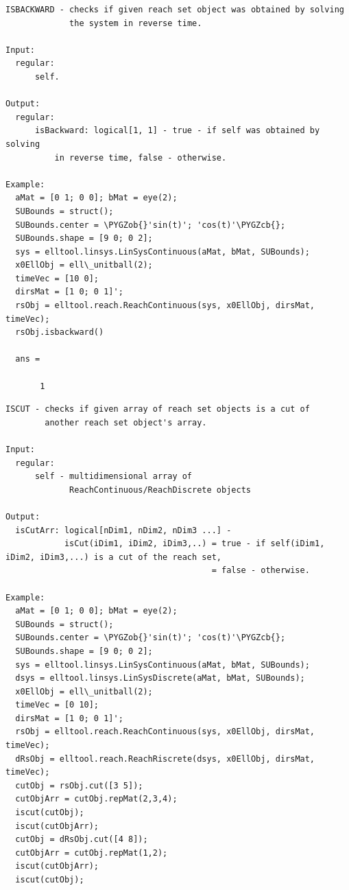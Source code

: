 \documentclass[letterpaper,10pt,english]{sphinxmanual}
\def\PYGZob{\char`\{}
\def\PYGZcb{\char`\}}
\begin{document}
\begin{Verbatim}[commandchars=\\\{\}]
ISBACKWARD - checks if given reach set object was obtained by solving
             the system in reverse time.

Input:
  regular:
      self.

Output:
  regular:
      isBackward: logical[1, 1] - true - if self was obtained by solving
          in reverse time, false - otherwise.

Example:
  aMat = [0 1; 0 0]; bMat = eye(2);
  SUBounds = struct();
  SUBounds.center = \PYGZob{}'sin(t)'; 'cos(t)'\PYGZcb{};
  SUBounds.shape = [9 0; 0 2];
  sys = elltool.linsys.LinSysContinuous(aMat, bMat, SUBounds);
  x0EllObj = ell\_unitball(2);
  timeVec = [10 0];
  dirsMat = [1 0; 0 1]';
  rsObj = elltool.reach.ReachContinuous(sys, x0EllObj, dirsMat, timeVec);
  rsObj.isbackward()

  ans =

       1
\end{Verbatim}

\begin{Verbatim}[commandchars=\\\{\}]
ISCUT - checks if given array of reach set objects is a cut of
        another reach set object's array.

Input:
  regular:
      self - multidimensional array of
             ReachContinuous/ReachDiscrete objects

Output:
  isCutArr: logical[nDim1, nDim2, nDim3 ...] -
            isCut(iDim1, iDim2, iDim3,..) = true - if self(iDim1, iDim2, iDim3,...) is a cut of the reach set,
                                          = false - otherwise.

Example:
  aMat = [0 1; 0 0]; bMat = eye(2);
  SUBounds = struct();
  SUBounds.center = \PYGZob{}'sin(t)'; 'cos(t)'\PYGZcb{};
  SUBounds.shape = [9 0; 0 2];
  sys = elltool.linsys.LinSysContinuous(aMat, bMat, SUBounds);
  dsys = elltool.linsys.LinSysDiscrete(aMat, bMat, SUBounds);
  x0EllObj = ell\_unitball(2);
  timeVec = [0 10];
  dirsMat = [1 0; 0 1]';
  rsObj = elltool.reach.ReachContinuous(sys, x0EllObj, dirsMat, timeVec);
  dRsObj = elltool.reach.ReachRiscrete(dsys, x0EllObj, dirsMat, timeVec);
  cutObj = rsObj.cut([3 5]);
  cutObjArr = cutObj.repMat(2,3,4);
  iscut(cutObj);
  iscut(cutObjArr);
  cutObj = dRsObj.cut([4 8]);
  cutObjArr = cutObj.repMat(1,2);
  iscut(cutObjArr);
  iscut(cutObj);
\end{Verbatim}
\end{document}
